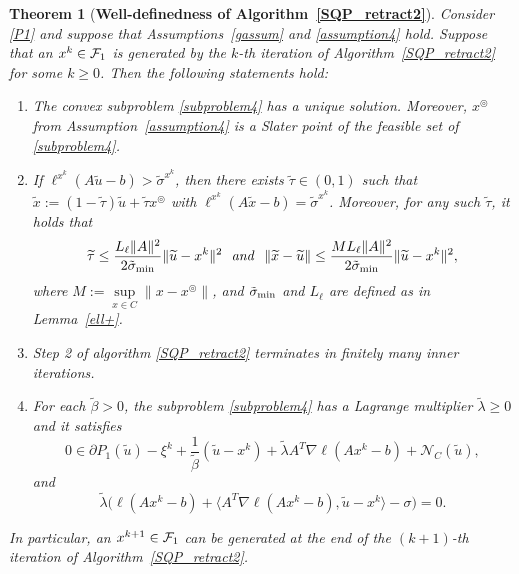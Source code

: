 \documentclass[10pt]{article}
\numberwithin{equation}{section}
\newtheorem{theorem}{Theorem}[section]
\def\sigmamin{{\rm\tilde{\sigma}_{min}}}
\def\xfeasss{x^\circledcirc}
\begin{document}
\begin{theorem}[{{\bf Well-definedness of Algorithm~\ref{SQP_retract2}}}]\label{welldef2}
Consider \eqref{P1} and suppose that Assumptions~\ref{gassum} and \ref{assumption4} hold. Suppose that an $x^k\in {\cal F}_1$ is generated by the $k$-th iteration of Algorithm~\ref{SQP_retract2} for some $k\ge 0$. Then the following statements hold:
\begin{enumerate}[{\rm (i)}]
   \item The convex subproblem \eqref{subproblem4} has a unique solution. Moreover, $\xfeasss$ from Assumption~\ref{assumption4} is a Slater point of the feasible set of \eqref{subproblem4}.
   \item If $\ell^{x^k}(A\widetilde{u} - b) > \tilde{\sigma}^{x^k}$, then there exists $\widetilde{\tau}\in (0, 1)$ such that $\widetilde{x}:=(1 - \widetilde{\tau})\widetilde{u} + \widetilde{\tau} \xfeasss$ with $\ell^{x^k}(A\widetilde{x} - b) = \tilde{\sigma}^{x^k}$. Moreover, for any such $\widetilde\tau$, it holds that
       \[
       \widetilde{\tau} \leq \frac{L_{\ell}\|A\|^2}{2\sigmamin}\|\widetilde{u} - x^k\|^2
       \ \ {\it and}\ \ \|\widetilde{x} - \widetilde{u}\| \leq \frac{ML_{\ell}\|A\|^2}{2\sigmamin}\|\widetilde{u} - x^k\|^2,
       \]
       where $M := \sup\limits_{x\in C}\|x - \xfeasss\|$, and $\sigmamin$ and $L_\ell$ are defined as in Lemma~\ref{ell+}.
   \item Step 2 of algorithm \ref{SQP_retract2} terminates in finitely many inner iterations.
   \item For each $\widetilde{\beta} > 0$, the subproblem \eqref{subproblem4} has a Lagrange multiplier $\widetilde\lambda\geq 0$ and it satisfies
       \begin{equation*}
       0\in \partial P_1(\widetilde{u}) - \xi^k +\frac{1}{\widetilde{\beta}}(\widetilde{u} - x^k) +\widetilde\lambda A^T\nabla\ell(Ax^k - b) + \mathcal{N}_C(\widetilde{u}),
       \end{equation*}
       and
       \begin{equation*}
       \widetilde\lambda\big(\ell(Ax^k - b) + \langle A^T\nabla\ell(Ax^k - b), \widetilde{u}-x^k\rangle - \sigma\big) = 0.
       \end{equation*}
 \end{enumerate}
 In particular, an $x^{k+1}\in {\cal F}_1$ can be generated at the end of the $(k + 1)$-th iteration of Algorithm~\ref{SQP_retract2}.
\end{theorem}
\end{document}
